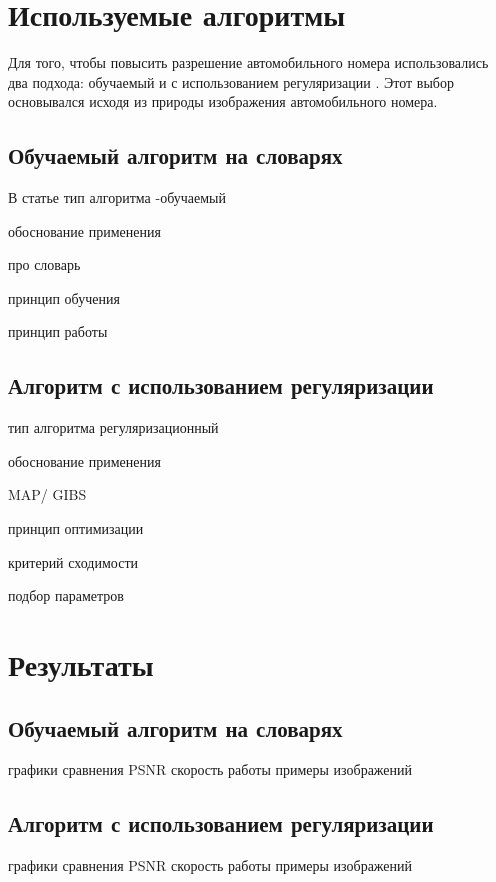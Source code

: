 \section{Используемые алгоритмы}

Для того, чтобы повысить разрешение автомобильного номера использовались два подхода: обучаемый \cite{yang2012coupled} и
с использованием регуляризации \cite{suresh2007superresolution}. Этот выбор основывался исходя из природы изображения
автомобильного номера.

\subsection{Обучаемый алгоритм на словарях}
В статье\cite{yang2012coupled}
тип алгоритма -обучаемый

обоснование применения

про словарь

принцип обучения

принцип работы

\subsection{Алгоритм с использованием регуляризации}

тип алгоритма регуляризационный

обоснование применения

MAP/ GIBS

принцип оптимизации

критерий сходимости

подбор параметров

\section{Результаты}

\subsection{Обучаемый алгоритм на словарях}

графики сравнения PSNR скорость работы примеры изображений

\subsection{Алгоритм с использованием регуляризации }

графики сравнения PSNR скорость работы примеры изображений


